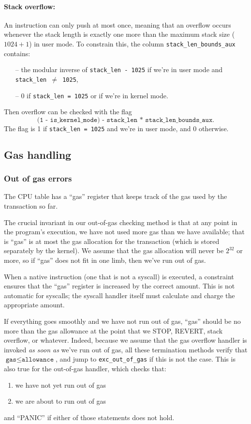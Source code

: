 \paragraph*{Stack overflow:}
An instruction can only push at most once, meaning that an overflow occurs whenever the stack length is exactly one more than the maximum stack size ($1024+1$) in user mode.
To constrain this, the column \texttt{stack\_len\_bounds\_aux} contains:

\begin{itemize}
  \item[--] the modular inverse of \texttt{stack\_len - 1025} if we're in user mode and \texttt{stack\_len $\neq$ 1025},
  \item[--] 0 if \texttt{stack\_len = 1025} or if we're in kernel mode.
\end{itemize}
Then overflow can be checked with the flag
$$\texttt{(1 - is\_kernel\_mode) - stack\_len * stack\_len\_bounds\_aux}.$$
The flag is 1 if \texttt{stack\_len = 1025} and we're in user mode, and 0 otherwise.

\subsection{Gas handling}

\subsubsection{Out of gas errors}

The CPU table has a ``gas'' register that keeps track of the gas used by the transaction so far.

The crucial invariant in our out-of-gas checking method is that at any point in the program's execution, we have not used more gas than we have available; that is ``gas'' is at most the gas allocation for the transaction (which is stored separately by the kernel). We assume that the gas allocation will never be $2^{32}$ or more, so if ``gas'' does not fit in one limb, then we've run out of gas.

When a native instruction (one that is not a syscall) is executed, a constraint ensures that the ``gas'' register is increased by the correct amount. This is not automatic for syscalls; the syscall handler itself must calculate and charge the appropriate amount.

If everything goes smoothly and we have not run out of gas, ``gas'' should be no more than the gas allowance at the point that we STOP, REVERT, stack overflow, or whatever. Indeed, because we assume that the gas overflow handler is invoked \textit{as soon as} we've run out of gas, all these termination methods verify that $\texttt{gas} \leq \texttt{allowance}$, and jump to \texttt{exc\_out\_of\_gas} if this is not the case. This is also true for the out-of-gas handler, which checks that: 
\begin{enumerate}
  \item we have not yet run out of gas
  \item we are about to run out of gas
\end{enumerate} 
and ``PANIC'' if either of those statements does not hold.

